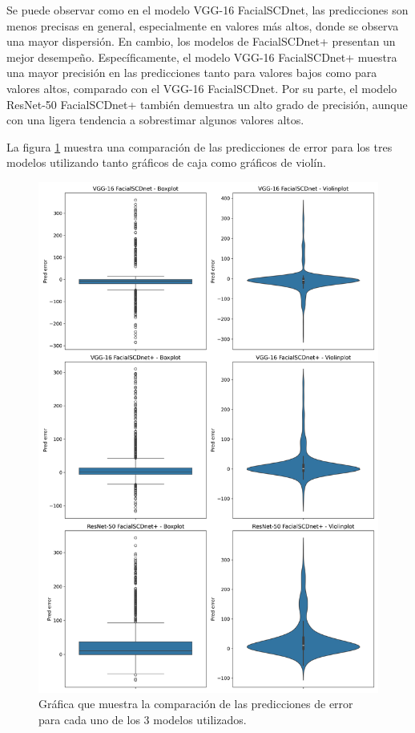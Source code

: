 Se puede observar como en el modelo VGG-16 FacialSCDnet, las predicciones son menos precisas en general, especialmente en valores más altos, donde se observa una mayor dispersión. En cambio, los modelos de FacialSCDnet+ presentan un mejor desempeño. Específicamente, el modelo VGG-16 FacialSCDnet+ muestra una mayor precisión en las predicciones tanto para valores bajos como para valores altos, comparado con el VGG-16 FacialSCDnet. Por su parte, el modelo ResNet-50 FacialSCDnet+ también demuestra un alto grado de precisión, aunque con una ligera tendencia a sobrestimar algunos valores altos. 

La figura \ref{fig35} muestra una comparación de las predicciones de error para los tres modelos utilizando tanto gráficos de caja como gráficos de violín.

\begin{figure}[h]
	\centering
	\includegraphics[width=\textwidth]{imagenes/cap5/boxplot_violinplot_comparison_real.png}
	\caption[Comparación predicciones de error test FacialSCDnet.]{Gráfica que muestra la comparación de las predicciones de error para cada uno de los 3 modelos utilizados.}
	\label{fig35}
\end{figure}

